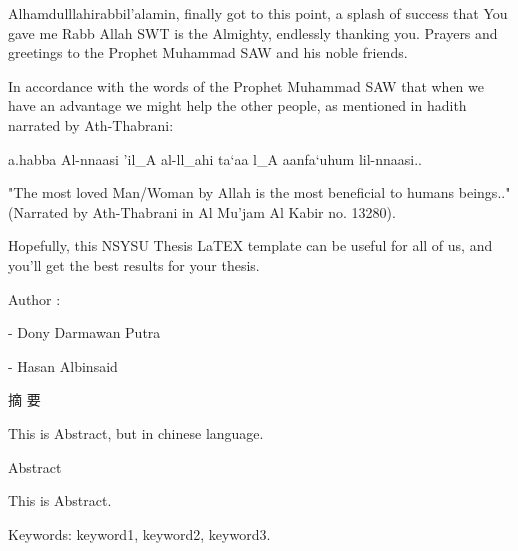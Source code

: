 \documentclass[12pt, twoside , openright]{book}
\begin{document}
Alhamdulllahirabbil’alamin, finally got to this point, a splash of success that You gave me Rabb Allah SWT is the Almighty, endlessly thanking you. Prayers and greetings to the Prophet Muhammad SAW and his noble friends.  

In accordance with the words of the Prophet Muhammad SAW that when we have an advantage we might help the other people, as mentioned in hadith narrated by Ath-Thabrani:

\begin{center}
	\begin{RLtext}
		a.habba Al-nnaasi 'il_A al-ll_ahi ta`aa l_A aanfa`uhum lil-nnaasi..
	\end{RLtext}
\end{center}


"The most loved Man/Woman by Allah is the most beneficial to humans  beings.." (Narrated by Ath-Thabrani in Al Mu’jam Al Kabir no. 13280).

Hopefully, this NSYSU Thesis LaTEX template can be useful for all of us, and you'll get the best results for your thesis.

\noindent
Author :

\vspace{-2em}
- Dony Darmawan Putra

\vspace{-2em}
- Hasan Albinsaid

\newpage
\mbox{}
\newpage





\begin{center}
	{\chinnesesize 摘 要}
\end{center}
This is Abstract, but in chinese language. \blindtext[1]
\newpage
\mbox{}
\newpage





\begin{center}
	{\chinnesesize Abstract}
\end{center}

This is Abstract. \blindtext[1]

\noindent Keywords: keyword1, keyword2, keyword3.
\newpage




\tableofcontents
\newpage




\listoffigures
\newpage
\end{document}
